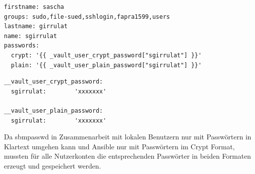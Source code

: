 \begin{lstlisting}[label=code:labelname,caption=Auszug aus ansible/group\_vars/file\_server/public]
firstname: sascha
groups: sudo,file-sued,sshlogin,fapra1599,users
lastname: girrulat
name: sgirrulat
passwords:
  crypt: '{{ _vault_user_crypt_password["sgirrulat"] }}'
  plain: '{{ _vault_user_plain_password["sgirrulat"] }}'
\end{lstlisting}

\begin{lstlisting}[label=code:labelname,caption=Modifizierter Auszug aus ansible/group\_vars/file\_server/vault]
__vault_user_crypt_password:
  sgirrulat:        'xxxxxxx'

__vault_user_plain_password:
  sgirrulat:        'xxxxxxx'
\end{lstlisting}

Da sbmpasswd in Zusammenarbeit mit lokalen Benutzern nur mit Passwörtern in Klartext umgehen kann und Ansible nur mit Passwörtern im Crypt Format, mussten für alle Nutzerkonten die entsprechenden Passwörter in beiden Formaten erzeugt und gespeichert werden.


